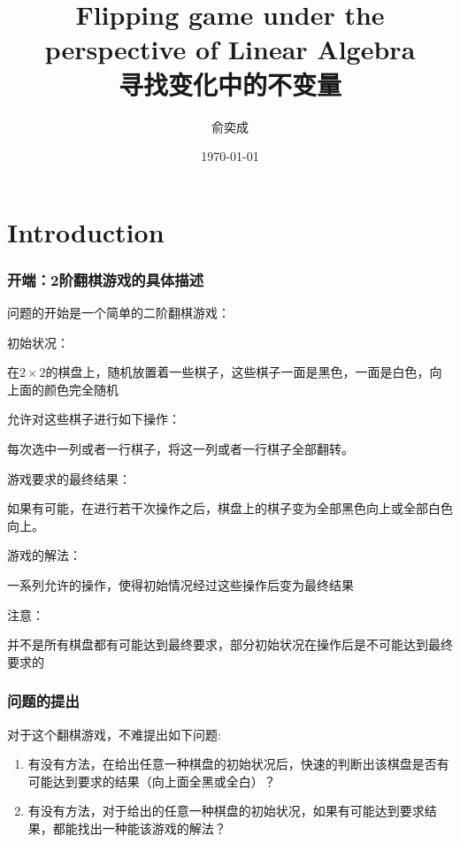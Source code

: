 \documentclass[UTF-8,a4paper]{ctexart}
\begin{document}
\title{Flipping game under the perspective of Linear Algebra\\寻找变化中的不变量}
\author{\kaishu 俞奕成}
\date{\kaishu \today}
\maketitle
\setcounter{tocdepth}{2}
\tableofcontents
\newpage

\part{Introduction}
\section{开端：2阶翻棋游戏的具体描述}
问题的开始是一个简单的二阶翻棋游戏：\par
初始状况：\par
\kaishu 在\(2 \times 2\)的棋盘上，随机放置着一些棋子，这些棋子一面是黑色，一面是白色，向上面的颜色完全随机 \par
\songti 允许对这些棋子进行如下操作：\par
\kaishu 每次选中一列或者一行棋子，将这一列或者一行棋子全部翻转。\par
\songti 游戏要求的最终结果：\par
\kaishu 如果有可能，在进行若干次操作之后，棋盘上的棋子变为全部黑色向上或全部白色向上。\par
\songti 游戏的解法：\par
\kaishu 一系列允许的操作，使得初始情况经过这些操作后变为最终结果 \par
\songti 注意：\par
\kaishu 并不是所有棋盘都有可能达到最终要求，部分初始状况在操作后是不可能达到最终要求的
\section{问题的提出}
\songti 对于这个翻棋游戏，不难提出如下问题:
\kaishu
\begin{enumerate}
    \item 有没有方法，在给出任意一种棋盘的初始状况后，快速的判断出该棋盘是否有可能达到要求的结果（向上面全黑或全白）？
    \item 有没有方法，对于给出的任意一种棋盘的初始状况，如果有可能达到要求结果，都能找出一种能该游戏的解法？
\end{enumerate}
\end{document}
